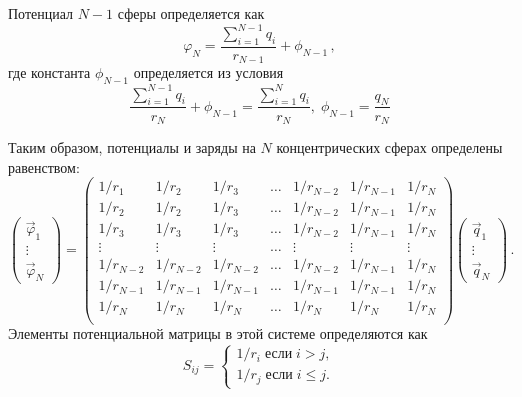 \documentclass[12pt,a4paper]{report}
\begin{document}
Потенциал $N-1$ сферы определяется как
\begin{equation}
  \varphi_N=\frac{\sum\limits_{i=1}^{N-1}q_i}{r_{N-1}}+\phi_{N-1}\,,
\end{equation}
где константа $\phi_{N-1}$ определяется из условия
\begin{equation}
 \frac{\sum\limits_{i=1}^{N-1}q_i}{r_{N}}+\phi_{N-1}=
 \frac{\sum\limits_{i=1}^Nq_i}{r_N},\;
  \phi_{N-1}=\frac{q_N}{r_N}
\end{equation}

Таким образом, потенциалы и заряды на $N$ концентрических сферах определены 
равенством:
\begin{equation}
  \left(
  \begin{array}{c}
    \vec \varphi_1\\
    \vdots\\
    \vec \varphi_N
  \end{array}
  \right)=
  \left(
  \begin{array}{ccccccc}
1/r_1 & 1/r_2 & 1/r_3 & \ldots & 1/r_{N-2} & 1/r_{N-1} & 1/r_N\\
1/r_2 & 1/r_2 & 1/r_3 & \ldots & 1/r_{N-2} & 1/r_{N-1} & 1/r_N\\
1/r_3 & 1/r_3 & 1/r_3 & \ldots & 1/r_{N-2} & 1/r_{N-1} & 1/r_N\\
\vdots & \vdots & \vdots & \ldots & \vdots & \vdots & \vdots\\
1/r_{N-2} & 1/r_{N-2} & 1/r_{N-2} & \ldots & 1/r_{N-2} & 1/r_{N-1} & 1/r_N\\
1/r_{N-1} & 1/r_{N-1} & 1/r_{N-1} & \ldots & 1/r_{N-1} & 1/r_{N-1} & 1/r_N\\    
1/r_N & 1/r_N & 1/r_N & \ldots & 1/r_N & 1/r_N & 1/r_N\\
  \end{array}
  \right)
  \left(
  \begin{array}{c}
    \vec q_1\\
    \vdots\\
    \vec q_N
  \end{array}
  \right)\,.
\end{equation}
Элементы потенциальной матрицы в этой системе определяются как
\begin{equation}
  S_{ij}=
  \left\{
  \begin{array}{c}
    1/r_i\;\mbox{если}\;i>j,\\
    1/r_j\;\mbox{если}\;i\le j.
  \end{array}
  \right.
\end{equation}
\end{document}
